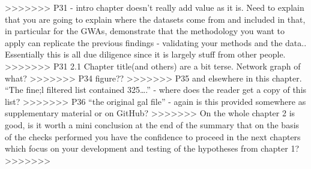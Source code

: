 >>>>>>> P31 - intro chapter doesn’t really add value as it is. Need to explain that you are going to explain where the datasets come from and included in that, in particular for the GWAs, demonstrate that the methodology you want to apply can replicate the previous findings - validating your methods and the data.. Essentially this is all due diligence since it is largely stuff from other people.
>>>>>>> P31 2.1 Chapter title(and others) are a bit terse. Network graph of what?
>>>>>>> P34 figure??
>>>>>>> P35 and elsewhere in this chapter. “The fine;l filtered list contained 325….” - where does the reader get a copy of this list?
>>>>>>> P36 “the original gal file” - again is this provided somewhere as supplementary material or on GitHub?
>>>>>>> On the whole chapter 2 is good, is it worth a mini conclusion at the end of the summary that on the basis of the checks performed you have the confidence to proceed in the next chapters which focus on your development and testing of the hypotheses from chapter 1?
>>>>>>>